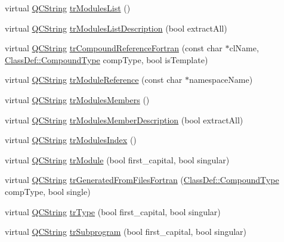 \begin{DoxyCompactItemize}
\item 
virtual \mbox{\hyperlink{class_q_c_string}{Q\+C\+String}} \mbox{\hyperlink{class_translator_slovak_a91faa4ab97831c46b89f56a39908d9fb}{tr\+Modules\+List}} ()
\item 
virtual \mbox{\hyperlink{class_q_c_string}{Q\+C\+String}} \mbox{\hyperlink{class_translator_slovak_a1ce4fb30dcc4e45536dc0a52b55c23bd}{tr\+Modules\+List\+Description}} (bool extract\+All)
\item 
virtual \mbox{\hyperlink{class_q_c_string}{Q\+C\+String}} \mbox{\hyperlink{class_translator_slovak_a68a769754184fb32a940bd05510e3bd8}{tr\+Compound\+Reference\+Fortran}} (const char $\ast$cl\+Name, \mbox{\hyperlink{class_class_def_ae70cf86d35fe954a94c566fbcfc87939}{Class\+Def\+::\+Compound\+Type}} comp\+Type, bool is\+Template)
\item 
virtual \mbox{\hyperlink{class_q_c_string}{Q\+C\+String}} \mbox{\hyperlink{class_translator_slovak_a5105b0b1d5f33b2f1f30ecd213a06b39}{tr\+Module\+Reference}} (const char $\ast$namespace\+Name)
\item 
virtual \mbox{\hyperlink{class_q_c_string}{Q\+C\+String}} \mbox{\hyperlink{class_translator_slovak_a024a828b40f9c7881af2894286a0eba1}{tr\+Modules\+Members}} ()
\item 
virtual \mbox{\hyperlink{class_q_c_string}{Q\+C\+String}} \mbox{\hyperlink{class_translator_slovak_a1ac61af10a79f3b9d20872536d653816}{tr\+Modules\+Member\+Description}} (bool extract\+All)
\item 
virtual \mbox{\hyperlink{class_q_c_string}{Q\+C\+String}} \mbox{\hyperlink{class_translator_slovak_ae3097da76dda89e7dccac87f29d13827}{tr\+Modules\+Index}} ()
\item 
virtual \mbox{\hyperlink{class_q_c_string}{Q\+C\+String}} \mbox{\hyperlink{class_translator_slovak_a08c192c98eb8515b9a686a03c080ad46}{tr\+Module}} (bool first\+\_\+capital, bool singular)
\item 
virtual \mbox{\hyperlink{class_q_c_string}{Q\+C\+String}} \mbox{\hyperlink{class_translator_slovak_ae37a8b1aed043cb480ca26adabea3f0a}{tr\+Generated\+From\+Files\+Fortran}} (\mbox{\hyperlink{class_class_def_ae70cf86d35fe954a94c566fbcfc87939}{Class\+Def\+::\+Compound\+Type}} comp\+Type, bool single)
\item 
virtual \mbox{\hyperlink{class_q_c_string}{Q\+C\+String}} \mbox{\hyperlink{class_translator_slovak_aecd4254284bb084bb8b35652c6156699}{tr\+Type}} (bool first\+\_\+capital, bool singular)
\item 
virtual \mbox{\hyperlink{class_q_c_string}{Q\+C\+String}} \mbox{\hyperlink{class_translator_slovak_a3f97d93199302c66d6cc1118ae63deaf}{tr\+Subprogram}} (bool first\+\_\+capital, bool singular)

\end{DoxyCompactItemize}
